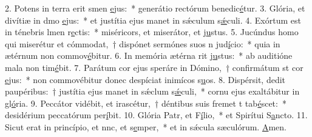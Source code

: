 2. Potens in terra erit smen \uline{e}jus:~* generátio rectórum benedic\uline{é}tur.
3. Glória, et divítiæ in dmo \uline{e}jus:~* et justítia ejus manet in sǽculum s\uline{ǽ}culi.
4. Exórtum est in ténebris lmen r\uline{e}ctis:~* miséricors, et miserátor, et j\uline{u}stus.
5. Jucúndus homo qui miserétur et cómmodat,~† dispónet sermónes suos n jud\uline{í}cio:~* quia in ætérnum non commov\uline{é}bitur.
6. In memória ætérna rit j\uline{u}stus:~* ab auditióne mala non tim\uline{é}bit.
7. Parátum cor ejus speráre in Dómino,~† confirmátum st cor \uline{e}jus:~* non commovébitur donec despíciat inimícos s\uline{u}os.
8. Dispérsit, dedit paupéribus:~† justítia ejus manet in sǽclum s\uline{ǽ}culi,~* cornu ejus exaltábitur in gl\uline{ó}ria.
9. Peccátor vidébit, et irascétur,~† déntibus suis fremet t tab\uline{é}scet:~* desidérium peccatórum per\uline{í}bit.
10. Glória Patr, et F\uline{í}lio,~* et Spirítui S\uline{a}ncto.
11. Sicut erat in princípio, et nnc, et s\uline{e}mper,~* et in sǽcula sæculórum. \uline{A}men.
